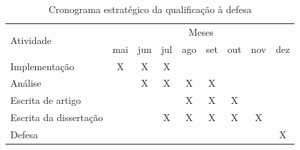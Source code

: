 \begin{table}[!ht]
\centering
\caption{Cronograma estratégico da qualificação à defesa}
\label{tab:cronograma_qualificacao_defesa}
\begin{tabular}{l c c c c c c c c}
\toprule
\multirow{2}{*}{Atividade} & \multicolumn{8}{c}{Meses} \\
& mai & jun & jul & ago & set & out & nov & dez \\
\midrule
Implementação & X & X & X & & & & & \\
Análise & & X & X & X & X & & & \\
Escrita de artigo & & & & X & X & X & & \\
Escrita da dissertação & & & X & X & X & X & X & \\
Defesa & & & & & & & & X \\
\bottomrule
\end{tabular}
\end{table}
